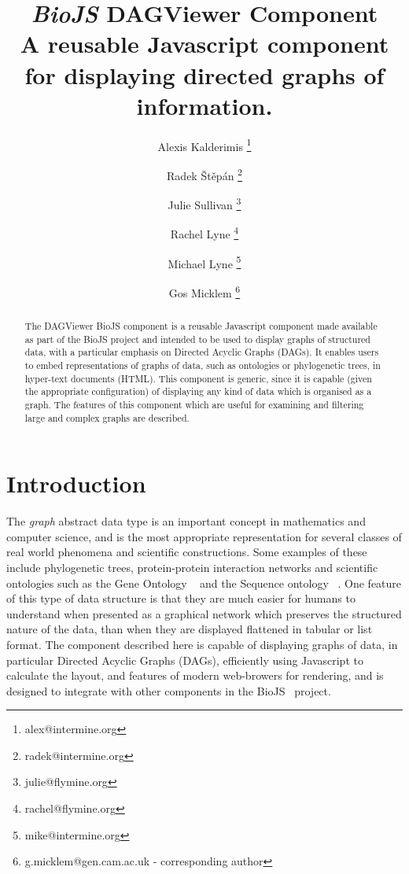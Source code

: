 \documentclass[10pt,a4paper,twocolumn]{article}
\begin{document}
\title{\textit{BioJS} DAGViewer Component \\
 \small{
  A reusable Javascript component for displaying directed graphs of information.
 }
}

\author[1]{Alexis Kalderimis \thanks{alex@intermine.org}}
\author[1]{Radek Štěpán \thanks{radek@intermine.org}}
\author[1]{Julie Sullivan \thanks{julie@flymine.org}}
\author[1]{Rachel Lyne \thanks{rachel@flymine.org}}
\author[1]{Michael Lyne \thanks{mike@intermine.org}}
\author[1]{Gos Micklem \thanks{g.micklem@gen.cam.ac.uk - corresponding author}}

\maketitle
\thispagestyle{fancy}


\begin{abstract}

The DAGViewer BioJS component is a reusable Javascript component made available
as part of the BioJS project and intended to be used to display graphs of
structured data, with a particular emphasis on Directed Acyclic Graphs (DAGs).
It enables users to embed representations of graphs of data, such as ontologies
or phylogenetic trees, in hyper-text documents (HTML).  This component is
generic, since it is capable (given the appropriate configuration) of displaying
any kind of data which is organised as a graph.  The features of this component
which are useful for examining and filtering large and complex graphs are
described.

\end{abstract}
\clearpage

\section*{Introduction}

The \emph{graph} abstract data type is an important concept in mathematics and
computer science, and is the most appropriate representation for several classes
of real world phenomena and scientific constructions. Some examples of these
include phylogenetic trees, protein-protein interaction networks and scientific
ontologies such as the Gene Ontology ~\cite{GO} and the Sequence ontology
~\cite{SO}. One feature of this type of data structure is that they are much
easier for humans to understand when presented as a graphical network which
preserves the structured nature of the data, than when they are displayed
flattened in tabular or list format. The component described here is capable of
displaying graphs of data, in particular Directed Acyclic Graphs (DAGs),
efficiently using Javascript to calculate the layout, and features of modern
web-browers for rendering, and is designed to integrate with other components in
the BioJS~\cite{site:biojs} project.
\end{document}
